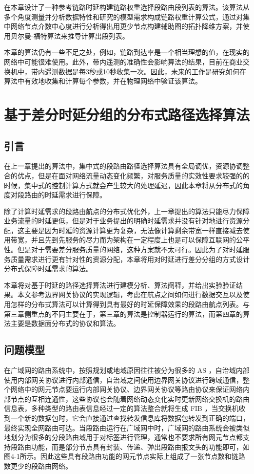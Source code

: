 在本章设计了一种参考链路时延构建链路权重选择段路由段列表的算法。该算法从多个角度测量并分析数据特性和研究的模型需求构成链路权重计算公式，通过对集中网络节点介数中心度进行分析得出用更少节点构建辅助图的拓扑降维方案，并使用贝尔曼-福特算法来推导计算出段列表。

本章的算法仍有一些不足之处，例如，链路到达率是一个相当理想的值，在现实的网络中可能很难使用。此外，带内遥测的准确性会影响算法的结果，目前在商业交换机中，带内遥测数据是每3秒或10秒收集一次。因此，未来的工作是研究如何在算法中有效地收集和计算每个参数，并在物理网络中验证该算法。

\chapter{基于差分时延分组的分布式路径选择算法}

\section{引言}

在上一章提出的算法中，集中式的段路由路径选择算法具有全局调优，资源协调整合的优点，但是在面对网络流量动态变化频繁，对服务质量的实效性要求较强的的时候，集中式的控制计算方式就会产生较大的处理延迟，因此本章将从分布式的角度对段路由的时延需求进行保障。

除了计算时延需求的段路由航点的分布式优化外，上一章提出的算法只能尽力保障业务流量的时延更低，但是对于业务提出的明确时延需求并没有针对地进行资源分配，这主要是因为时延的资源计算更为复杂，无法像计算剩余带宽一样直接减去使用带宽，并且先到先服务的尽力而为架构在一定程度上也是可以保障互联网的公平性。但是对于需要差分服务质量的网络，这种方案就不太可行。因此为了对时延服务质量需求进行更有针对性的资源分配，本章将用对时延进行差分分组的方式设计分布式保障时延需求的算法。

本章将对基于时延的路径选择算法进行建模分析、算法阐释，并给出实验验证结果。本文参考边界网关协议的实现逻辑，考虑在航点之间如何进行数据交互以及使用怎样的分布式算法可以计算得到具有最好的时延保障效果的段路由航点列表。与第三章侧重点的不同主要在于，第三章的算法是控制器运行的算法，而第四章的算法主要是数据面分布式的协议和算法。

\section{问题模型}

在广域网的路由系统中，按照规划或地域原因往往被分为很多的 \gls*{AS} ，自治域内部使用内部网关协议进行内部通信，自治域之间使用边界网关协议进行跨域通信，整个网络中的网元节点要运行内部网关协议、边界网关协议等路由协议来保证网络内部节点的互相连通性，这些协议也会随着网络动态变化实时更新网络交换机的路由信息表，多种类型的路由表信息经过一定的算法整合就将生成 \gls*{FIB} ，当交换机收到一个新的数据包时，它会直接通过查找转发信息库将数据包转发到正确的端口，最终实现全网路由可达。当段路由运行在广域网中时，广域网的路由系统会被类似地划分为很多的分段路由域用于对标签进行管理，通常也不要求所有网元节点都支持段路由功能，而是部分节点具有封装、传递、弹出段路由报文头的功能即可，如图4-1所示。因此这些具有段路由功能的网元节点实际上组成了一张节点数和链路数更少的段路由网络。

